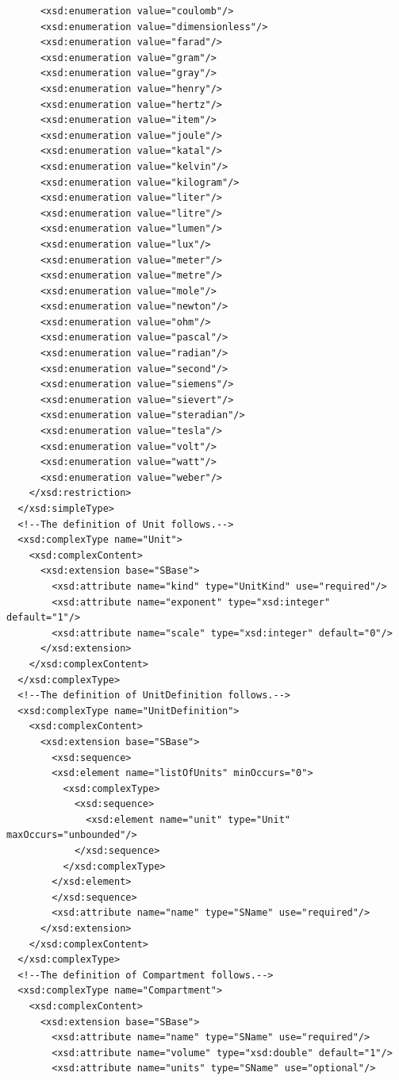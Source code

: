 \documentclass[10pt]{cekarticle}
\newenvironment{blockChanged}{\color{BrickRed}}{}
\begin{document}
\begin{blockChanged}
\begin{small}
\begin{verbatim}
      <xsd:enumeration value="coulomb"/>
      <xsd:enumeration value="dimensionless"/>
      <xsd:enumeration value="farad"/>
      <xsd:enumeration value="gram"/>
      <xsd:enumeration value="gray"/>
      <xsd:enumeration value="henry"/>
      <xsd:enumeration value="hertz"/>
      <xsd:enumeration value="item"/>
      <xsd:enumeration value="joule"/>
      <xsd:enumeration value="katal"/>
      <xsd:enumeration value="kelvin"/>
      <xsd:enumeration value="kilogram"/>
      <xsd:enumeration value="liter"/>
      <xsd:enumeration value="litre"/>
      <xsd:enumeration value="lumen"/>
      <xsd:enumeration value="lux"/>
      <xsd:enumeration value="meter"/>
      <xsd:enumeration value="metre"/>
      <xsd:enumeration value="mole"/>
      <xsd:enumeration value="newton"/>
      <xsd:enumeration value="ohm"/>
      <xsd:enumeration value="pascal"/>
      <xsd:enumeration value="radian"/>
      <xsd:enumeration value="second"/>
      <xsd:enumeration value="siemens"/>
      <xsd:enumeration value="sievert"/>
      <xsd:enumeration value="steradian"/>
      <xsd:enumeration value="tesla"/>
      <xsd:enumeration value="volt"/>
      <xsd:enumeration value="watt"/>
      <xsd:enumeration value="weber"/>
    </xsd:restriction>
  </xsd:simpleType>
  <!--The definition of Unit follows.-->
  <xsd:complexType name="Unit">
    <xsd:complexContent>
      <xsd:extension base="SBase">
      	<xsd:attribute name="kind" type="UnitKind" use="required"/>
      	<xsd:attribute name="exponent" type="xsd:integer" default="1"/>
      	<xsd:attribute name="scale" type="xsd:integer" default="0"/>
      </xsd:extension>
    </xsd:complexContent>
  </xsd:complexType>
  <!--The definition of UnitDefinition follows.-->
  <xsd:complexType name="UnitDefinition">
    <xsd:complexContent>
      <xsd:extension base="SBase">
      	<xsd:sequence>
        <xsd:element name="listOfUnits" minOccurs="0">
          <xsd:complexType>
            <xsd:sequence>
              <xsd:element name="unit" type="Unit" maxOccurs="unbounded"/>
            </xsd:sequence>
          </xsd:complexType>
        </xsd:element>
      	</xsd:sequence>
      	<xsd:attribute name="name" type="SName" use="required"/>
      </xsd:extension>
    </xsd:complexContent>
  </xsd:complexType>
  <!--The definition of Compartment follows.-->
  <xsd:complexType name="Compartment">
    <xsd:complexContent>
      <xsd:extension base="SBase">
      	<xsd:attribute name="name" type="SName" use="required"/>
      	<xsd:attribute name="volume" type="xsd:double" default="1"/>
      	<xsd:attribute name="units" type="SName" use="optional"/>

\end{verbatim}
\end{small}
\end{blockChanged}
\end{document}
